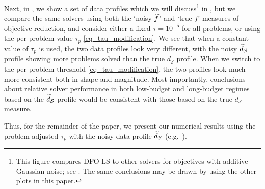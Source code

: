 Next, in , we show a set of data profiles which we will discuss\footnote{\:This figure compares DFO-LS to other solvers for objectives with additive Gaussian noise; see . The same conclusions may be drawn by using the other plots in this paper.} in , but we compare the same solvers using both the `noisy $\widetilde{f}$' and `true $f$' measures of objective reduction, and consider either a fixed $\tau=10^{-5}$ for all problems, or using the per-problem value $\tau_p$ \eqref{eq_tau_modification}. 
We see that when a constant value of $\tau_p$ is used, the two data profiles look very different, with the noisy $\widetilde{d}_{\mathcal{S}}$ profile showing more problems solved than the true $d_{\mathcal{S}}$ profile.
When we switch to the per-problem threshold \eqref{eq_tau_modification}, the two profiles look much more consistent both in shape and magnitude.
Most importantly, conclusions about relative solver performance in both low-budget and long-budget regimes based on the $\widetilde{d}_{\mathcal{S}}$ profile would be consistent with those based on the true $d_{\mathcal{S}}$ measure.

Thus, for the remainder of the paper, we present our numerical results  using the problem-adjusted $\tau_p$ with the noisy data profile $\widetilde{d}_{\mathcal{S}}$ (e.g.~).


